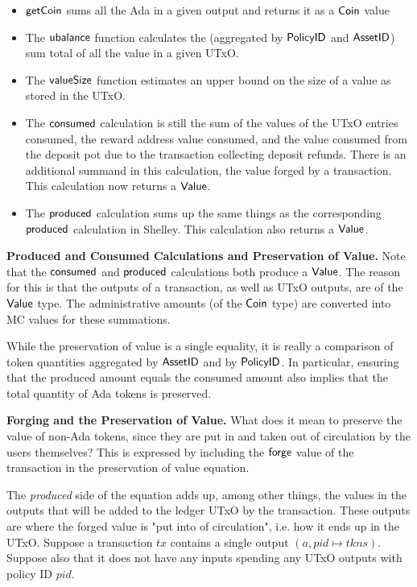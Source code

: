 \begin{itemize}

  \item $\mathsf{getCoin}$ sums all the Ada in a given output and returns it as a
  $\mathsf{Coin}$ value

  \item
    The $\mathsf{ubalance}$ function calculates the (aggregated by $\mathsf{PolicyID}$ and
    $\mathsf{AssetID}$) sum total of all the value in a given UTxO.

  \item
    The $\mathsf{valueSize}$ function estimates an upper bound on the size of a value
    as stored in the UTxO.

  \item The $\mathsf{consumed}$ calculation is still the sum of the values of the
   UTxO entries consumed, the reward address value consumed,
   and the value consumed from the deposit pot due
   to the transaction collecting deposit refunds. There is an additional
   summand in this calculation, the value forged by a transaction.
   This calculation now returns a $\mathsf{Value}$.

  \item The $\mathsf{produced}$ calculation sums up the same things
  as the corresponding $\mathsf{produced}$ calculation in Shelley.
  This calculation also returns a $\mathsf{Value}$.
\end{itemize}

\textbf{Produced and Consumed Calculations and Preservation of Value.}
Note that
the $\mathsf{consumed}$ and $\mathsf{produced}$ calculations both produce a $\mathsf{Value}$.
The reason for this is that the outputs of a transaction, as well as UTxO outputs,
are of the $\mathsf{Value}$ type. The administrative amounts (of the $\mathsf{Coin}$ type)
are converted into MC values for these summations.

While the preservation of value is a single
equality, it is really a comparison of token quantities aggregated by
$\mathsf{AssetID}$ and by $\mathsf{PolicyID}$. In particular, ensuring that the produced
amount equals the consumed amount also implies that the total quantity of
Ada tokens is preserved.

\textbf{Forging and the Preservation of Value.}
What does it mean to preserve the value of non-Ada tokens, since they
are put in and taken out of circulation by the users themselves?
This is expressed by including the $\mathsf{forge}$ value of the transaction
in the preservation of value equation.

The \textit{produced} side of the equation adds up, among other things, the
values in the
outputs that will be added to the ledger UTxO by the transaction. These outputs are
where the
forged value is "put into of circulation", i.e. how it ends up in the UTxO.
Suppose a transaction $tx$ contains a single output $(a, pid \mapsto tkns)$. Suppose
also that it does not
have any inputs spending any UTxO outputs with policy ID $pid$.

